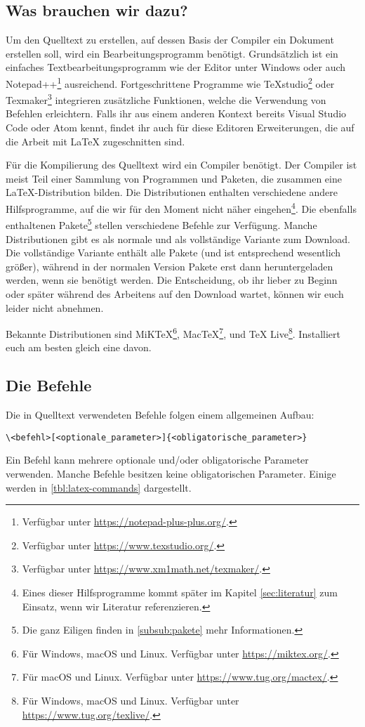 \subsection{Was brauchen wir dazu?}
\label{sub:was_brauchen_wir_dazu}
Um den Quelltext zu erstellen, auf dessen Basis der Compiler ein Dokument erstellen soll, wird ein Bearbeitungsprogramm benötigt.
Grundsätzlich ist ein einfaches Textbearbeitungsprogramm wie der Editor unter Windows oder auch Notepad++\footnote{Verfügbar unter \url{https://notepad-plus-plus.org/}.} ausreichend.
Fortgeschrittene Programme wie TeXstudio\footnote{Verfügbar unter \url{https://www.texstudio.org/}.} oder Texmaker\footnote{Verfügbar unter \url{https://www.xm1math.net/texmaker/}.} integrieren zusätzliche Funktionen, welche die Verwendung von Befehlen erleichtern.
Falls ihr aus einem anderen Kontext bereits Visual Studio Code oder Atom kennt, findet ihr auch für diese Editoren Erweiterungen, die auf die Arbeit mit \LaTeX{} zugeschnitten sind.

Für die Kompilierung des Quelltext wird ein Compiler benötigt.
Der Compiler ist meist Teil einer Sammlung von Programmen und Paketen, die zusammen eine \LaTeX-Distribution bilden.
Die Distributionen enthalten verschiedene andere Hilfsprogramme, auf die wir für den Moment nicht näher eingehen\footnote{Eines dieser Hilfsprogramme kommt später im Kapitel \ref{sec:literatur} zum Einsatz, wenn wir Literatur referenzieren.}.
Die ebenfalls enthaltenen Pakete\footnote{Die ganz Eiligen finden in \cref{subsub:pakete} mehr Informationen.} stellen verschiedene Befehle zur Verfügung.
Manche Distributionen gibt es als normale und als vollständige Variante zum Download. 
Die vollständige Variante enthält alle Pakete (und ist entsprechend wesentlich größer), während in der normalen Version Pakete erst dann heruntergeladen werden, wenn sie benötigt werden.
Die Entscheidung, ob ihr lieber zu Beginn oder später während des Arbeitens auf den Download wartet, können wir euch leider nicht abnehmen.

Bekannte Distributionen sind MiK\TeX\footnote{Für Windows, macOS und Linux. Verfügbar unter \url{https://miktex.org/}.}, Mac\TeX\footnote{Für macOS und Linux. Verfügbar unter \url{https://www.tug.org/mactex/}.}, und \TeX{} Live\footnote{Für Windows, macOS und Linux. Verfügbar unter \url{https://www.tug.org/texlive/}.}.
Installiert euch am besten gleich eine davon.

\subsection{Die Befehle}
\label{sub:die_befehle}
Die in Quelltext verwendeten Befehle folgen einem allgemeinen Aufbau:
\begin{verbatim}
\<befehl>[<optionale_parameter>]{<obligatorische_parameter>}
\end{verbatim}
Ein Befehl kann mehrere optionale und/oder obligatorische Parameter verwenden. Manche Befehle besitzen keine obligatorischen Parameter. Einige werden in \cref{tbl:latex-commands} dargestellt.

